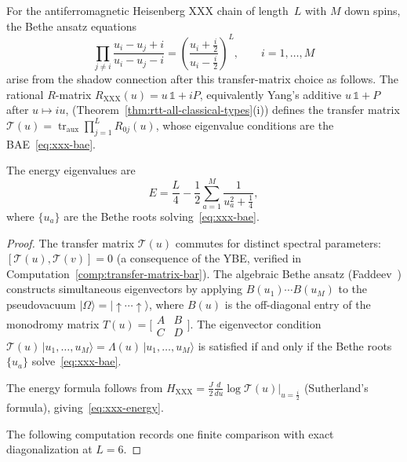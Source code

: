 \begin{theorem}
\label{thm:bethe-from-mc}
For the antiferromagnetic Heisenberg XXX chain of length~$L$ with
$M$ down spins, the Bethe ansatz equations
\begin{equation}\label{eq:xxx-bae}
\prod_{j \neq i} \frac{u_i - u_j + i}{u_i - u_j - i}
= \left(\frac{u_i + \frac{i}{2}}{u_i - \frac{i}{2}}\right)^{\!L},
\qquad i = 1, \ldots, M
\end{equation}
arise from the shadow connection after this transfer-matrix choice as
follows. The rational
$R$-matrix \(R_{\mathrm{XXX}}(u)=u\,\mathbb{1}+iP\), equivalently
Yang's additive \(u\,\mathbb{1}+P\) after \(u\mapsto iu\),
\textup{(}Theorem~\textup{\ref{thm:rtt-all-classical-types}(i))}
defines the transfer matrix
$\mathcal{T}(u) = \operatorname{tr}_{\mathrm{aux}}
\prod_{j=1}^{L} R_{0j}(u)$,
whose eigenvalue conditions are the
BAE~\eqref{eq:xxx-bae}.

The energy eigenvalues are
\begin{equation}\label{eq:xxx-energy}
E = \frac{L}{4} - \frac{1}{2} \sum_{a=1}^{M}
 \frac{1}{u_a^2 + \frac{1}{4}},
\end{equation}
where $\{u_a\}$ are the Bethe roots solving~\eqref{eq:xxx-bae}.
\end{theorem}

\begin{proof}
The transfer matrix $\mathcal{T}(u)$ commutes for distinct
spectral parameters: $[\mathcal{T}(u), \mathcal{T}(v)] = 0$
(a consequence of the YBE, verified in
Computation~\ref{comp:transfer-matrix-bar}). The algebraic Bethe
ansatz \textup{(}Faddeev~\cite{Faddeev96}\textup{)} constructs
simultaneous eigenvectors by applying $B(u_1) \cdots B(u_M)$ to
the pseudovacuum $|\Omega\rangle = |{\uparrow \cdots \uparrow}\rangle$,
where $B(u)$ is the off-diagonal entry of the monodromy matrix
$T(u) = \bigl[\begin{smallmatrix} A & B \\ C & D \end{smallmatrix}\bigr]$.
The eigenvector condition $\mathcal{T}(u)\,|u_1, \ldots, u_M\rangle
= \Lambda(u)\,|u_1, \ldots, u_M\rangle$ is satisfied if and only if
the Bethe roots $\{u_a\}$ solve~\eqref{eq:xxx-bae}.

The energy formula follows from
$H_{\mathrm{XXX}} = \frac{J}{2}
\frac{d}{du}\log \mathcal{T}(u)\big|_{u=\frac{i}{2}}$
(Sutherland's formula), giving~\eqref{eq:xxx-energy}.

The following computation records one finite comparison with exact
diagonalization at $L=6$.
\end{proof}

